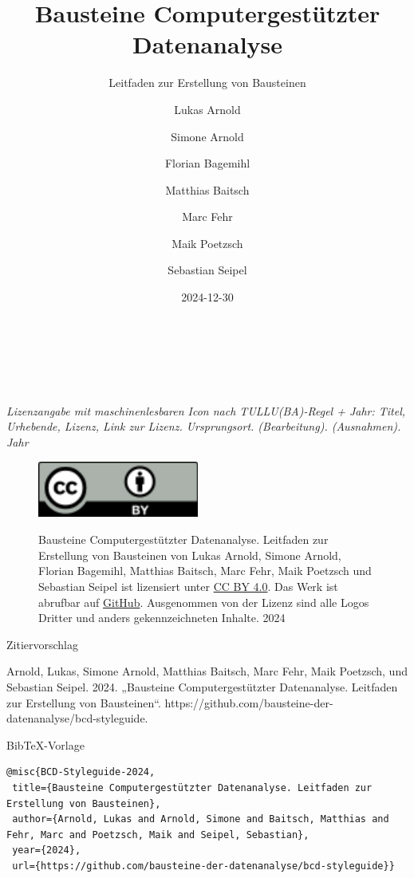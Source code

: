\documentclass[
  letterpaper,
  DIV=11]{scrartcl}
\title{Bausteine Computergestützter Datenanalyse}
\subtitle{Leitfaden zur Erstellung von Bausteinen}
\author{Lukas Arnold \and Simone Arnold \and Florian
Bagemihl \and Matthias Baitsch \and Marc Fehr \and Maik
Poetzsch \and Sebastian Seipel}
\date{2024-12-30}
\renewcommand*\contentsname{Inhaltsverzeichnis}
\newcommand\contentsname{Inhaltsverzeichnis}
\begin{document}
\maketitle

\renewcommand*\contentsname{Leitfaden zur Erstellung von Bausteinen}
{
\hypersetup{linkcolor=}
\setcounter{tocdepth}{3}
\tableofcontents
}
~

~

\label{Lizenz}
\emph{Lizenzangabe mit maschinenlesbaren Icon nach TULLU(BA)-Regel +
Jahr: Titel, Urhebende, Lizenz, Link zur Lizenz. Ursprungsort.
(Bearbeitung). (Ausnahmen). Jahr}

\begin{figure}

\begin{minipage}{0.20\linewidth}
\includegraphics{skript/00-bilder/CC-BY.pdf} \end{minipage}%
%
\begin{minipage}{0.80\linewidth}
Bausteine Computergestützter Datenanalyse. Leitfaden zur Erstellung von
Bausteinen von Lukas Arnold, Simone Arnold, Florian Bagemihl, Matthias
Baitsch, Marc Fehr, Maik Poetzsch und Sebastian Seipel ist lizensiert
unter \href{https://creativecommons.org/licenses/by/4.0/deed.de}{CC BY
4.0}. Das Werk ist abrufbar auf
\href{https://github.com/bausteine-der-datenanalyse/bcd-styleguide}{GitHub}.
Ausgenommen von der Lizenz sind alle Logos Dritter und anders
gekennzeichneten Inhalte. 2024\end{minipage}%

\end{figure}%

Zitiervorschlag

Arnold, Lukas, Simone Arnold, Matthias Baitsch, Marc Fehr, Maik
Poetzsch, und Sebastian Seipel. 2024. „Bausteine Computergestützter
Datenanalyse. Leitfaden zur Erstellung von Bausteinen``.
https://github.com/bausteine-der-datenanalyse/bcd-styleguide.

BibTeX-Vorlage

\begin{verbatim}
@misc{BCD-Styleguide-2024,
 title={Bausteine Computergestützter Datenanalyse. Leitfaden zur Erstellung von Bausteinen},
 author={Arnold, Lukas and Arnold, Simone and Baitsch, Matthias and Fehr, Marc and Poetzsch, Maik and Seipel, Sebastian},
 year={2024},
 url={https://github.com/bausteine-der-datenanalyse/bcd-styleguide}} 
\end{verbatim}
\end{document}
